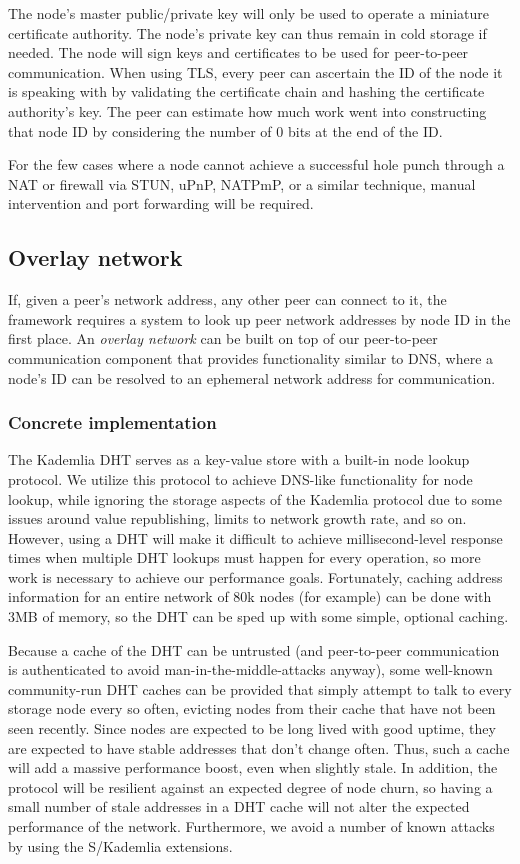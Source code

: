 \documentclass[a4paper,10pt]{article} \usepackage[utf8]{inputenc}
\begin{document}
The node's master public/private key will only be used to operate a miniature
certificate authority. The node's private key can thus remain in cold storage if
needed. The node will sign keys and certificates to be used for peer-to-peer
communication. When using TLS, every peer can ascertain the ID of the node it is
speaking with by validating the certificate chain and hashing the certificate
authority's key. The peer can estimate how much work went into constructing that
node ID by considering the number of 0 bits at the end of the ID.

For the few cases where a node cannot achieve a successful hole punch through a
NAT or firewall via STUN, uPnP, NATPmP, or a similar technique, manual
intervention and port forwarding will be required.

\subsection{Overlay network}

If, given a peer's network address, any other peer can connect to it, the
framework requires a system to look up peer network addresses by node ID in the
first place. An {\em overlay network} can be built on top of our peer-to-peer
communication component that provides functionality similar to DNS, where a
node's ID can be resolved to an ephemeral network address for communication.

\subsubsection{Concrete implementation}

The Kademlia DHT serves as a key-value store with a built-in node lookup
protocol. We utilize this protocol to achieve DNS-like functionality for node
lookup, while ignoring the storage aspects of the Kademlia protocol due to some
issues around value republishing, limits to network growth rate, and so on.
However, using a DHT will make it difficult to achieve millisecond-level
response times when multiple DHT lookups must happen for every operation, so
more work is necessary to achieve our performance goals. Fortunately, caching
address information for an entire network of 80k nodes (for example) can be done
with 3MB of memory, so the DHT can be sped up with some simple, optional
caching.

Because a cache of the DHT can be untrusted (and peer-to-peer communication is
authenticated to avoid man-in-the-middle-attacks anyway), some well-known
community-run DHT caches can be provided that simply attempt to talk to every
storage node every so often, evicting nodes from their cache that have not been
seen recently. Since nodes are expected to be long lived with good uptime, they
are expected to have stable addresses that don't change often. Thus, such a
cache will add a massive performance boost, even when slightly stale. In
addition, the protocol will be resilient against an expected degree of node
churn, so having a small number of stale addresses in a DHT cache will not alter
the expected performance of the network. Furthermore, we avoid a number of known
attacks by using the S/Kademlia extensions.
\end{document}
